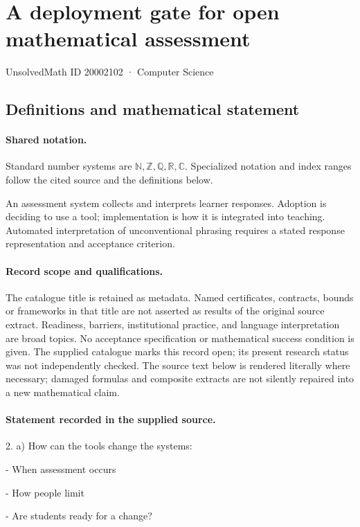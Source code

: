 \documentclass[11pt]{article}
\begin{document}
\setcounter{section}{20002101}
\section{A deployment gate for open mathematical assessment}\label{20002102}
{\small\sffamily UnsolvedMath ID 20002102 · Computer Science}
\subsection{Definitions and mathematical statement}

\paragraph{Shared notation.}Standard number systems are $\mathbb N,\mathbb Z,\mathbb Q,\mathbb R,\mathbb C$. Specialized notation and index ranges follow the cited source and the definitions below.


An assessment system collects and interprets learner responses. Adoption is deciding to use a tool; implementation is how it is integrated into teaching. Automated interpretation of unconventional phrasing requires a stated response representation and acceptance criterion.
\paragraph{Record scope and qualifications.}
The catalogue title is retained as metadata. Named certificates, contracts, bounds or frameworks in that title are not asserted as results of the original source extract.
Readiness, barriers, institutional practice, and language interpretation are broad topics. No acceptance specification or mathematical success condition is given. The supplied catalogue marks this record open; its present research status was not independently checked.
The source text below is rendered literally where necessary; damaged formulas and composite extracts are not silently repaired into a new mathematical claim.
\paragraph{Statement recorded in the supplied source.}
2. a) How can the tools change the systems:

- When assessment occurs

- How people limit

- Are students ready for a change?
\end{document}
